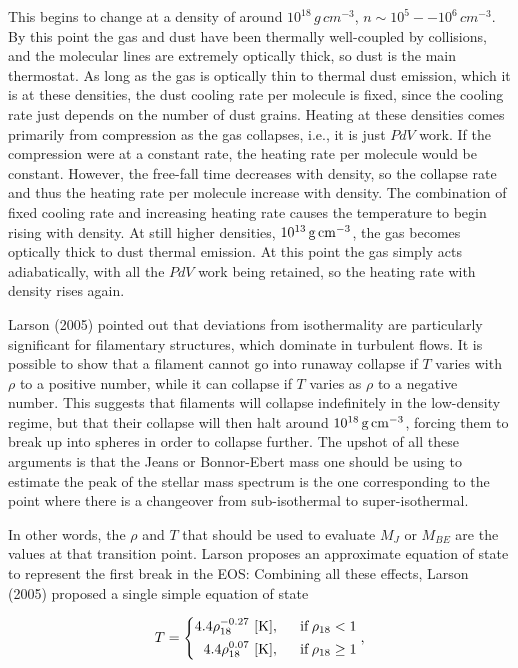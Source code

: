 \documentclass[a4paper,10pt]{article}
\begin{document}
{\noindent}This begins to change at a density of around $10^{18}\,{g\,cm^{-3}}$, $n\sim10^5--10^6\,{cm^{-3}}$. By this point the gas and dust have been thermally well-coupled by collisions, and the molecular lines are extremely optically thick, so dust is the main thermostat. As long as the gas is optically thin to thermal dust emission, which it is at these densities, the dust cooling rate per molecule is fixed, since the cooling rate just depends on the number of dust grains. Heating at these densities comes primarily from compression as the gas collapses, i.e., it is just $PdV$ work. If the compression were at a constant rate, the heating rate per molecule would be constant. However, the free-fall time decreases with density, so the collapse rate and thus the heating rate per molecule increase with density. The combination of fixed cooling rate and increasing heating rate causes the temperature to begin rising with density. At still higher densities, $10^{13}\,{\rm g\,cm^{-3}}$, the gas becomes optically thick to dust thermal emission. At this point the gas simply acts adiabatically, with all the $PdV$ work being retained, so the heating rate with density rises again.

{\noindent}Larson (2005) pointed out that deviations from isothermality are particularly significant for filamentary structures, which dominate in turbulent flows. It is possible to show that a filament cannot go into runaway collapse if $T$ varies with $\rho$ to a positive number, while it can collapse if $T$ varies as $\rho$ to a negative number. This suggests that filaments will collapse indefinitely in the low-density regime, but that their collapse will then halt around $10^{18}\,{\rm g\,cm^{-3}}$, forcing them to break up into spheres in order to collapse further. The upshot of all these arguments is that the Jeans or Bonnor-Ebert mass one should be using to estimate the peak of the stellar mass spectrum is the one corresponding to the point where there is a changeover from sub-isothermal to super-isothermal.

{\noindent}In other words, the $\rho$ and $T$ that should be used to evaluate $M_J$ or $M_{BE}$ are the values at that transition point. Larson proposes an approximate equation of state to represent the first break in the EOS: Combining all these effects, Larson (2005) proposed a single simple equation of state

\begin{equation*}
T =
\left\{
\begin{aligned}
4.4\rho_{18}^{-0.27} ~ [{\rm K}], ~~~~~& \mathrm{if}\,\rho_{18}<1 \\
4.4\rho_{18}^{0.07} ~ [{\rm K}], ~~~~~& \mathrm{if}\,\rho_{18}\geq1
\end{aligned}
\right.
,
\end{equation*}
\end{document}
